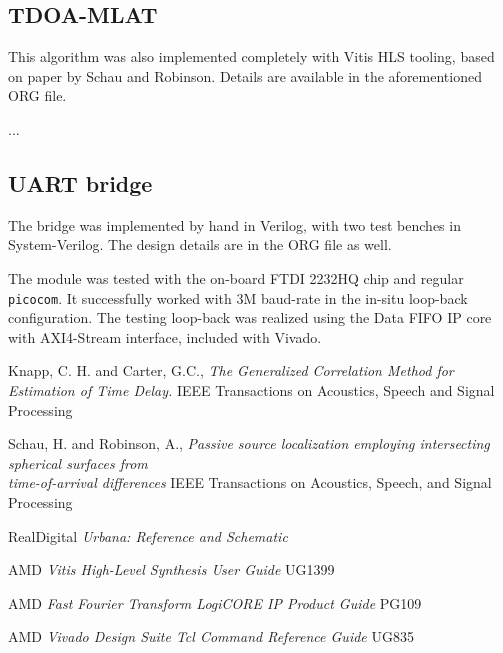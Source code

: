 \documentclass[a4paper,twocolumn]{article}
\begin{document}
\subsection{TDOA-MLAT}

This algorithm was also implemented completely with Vitis HLS tooling,
based on paper by Schau and Robinson\cite{tdoamlat}. Details are
available in the aforementioned ORG file.


...

\subsection{UART bridge}

The bridge was implemented by hand in Verilog, with two test benches
in System-Verilog. The design details are in the ORG file as well.

The module was tested with the on-board FTDI 2232HQ chip and regular
\texttt{picocom}. It successfully worked with 3M baud-rate in the
in-situ loop-back configuration. The testing loop-back was realized
using the Data FIFO IP core with AXI4-Stream interface, included with
Vivado.

\begin{thebibliography}{9}
  Knapp, C. H. and Carter, G.C., \emph{The Generalized Correlation
  Method for Estimation of Time Delay.} IEEE Transactions on Acoustics,
  Speech and Signal Processing

  Schau, H. and Robinson, A., \emph{Passive source localization
  employing intersecting spherical surfaces from\\
  time-of-arrival differences} IEEE Transactions on Acoustics, Speech, and Signal
  Processing

  RealDigital \emph{Urbana: Reference and Schematic}

  AMD \emph{Vitis High-Level Synthesis User Guide} UG1399

  AMD \emph{Fast Fourier Transform LogiCORE IP Product Guide} PG109

  AMD \emph{Vivado Design Suite Tcl Command Reference Guide} UG835
  
\end{thebibliography}
\end{document}
